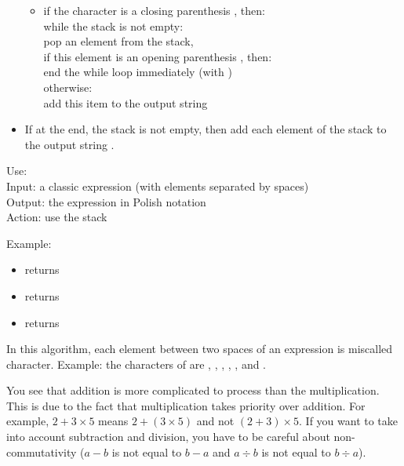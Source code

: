 \documentclass[11pt,class=report,crop=false]{standalone}
\begin{document}
\begin{activite}
\begin{algorithme}
\begin{itemize}
\begin{itemize}
     \item if the character is a closing parenthesis , then: \\
     while the stack is not empty: \\
     \indentation pop an element from the stack, \\
     \indentation if this element is an opening parenthesis , then: \\
     \indentation \indentation end the \og{}while\fg{} loop immediately  (with )\\  
     \indentation otherwise: \\       
     \indentation \indentation add this item to the output string \\

   \end{itemize}          
         
    \item If at the end, the stack is not empty, then add each element of the stack to the output string .
  \end{itemize} 
             
 \end{algorithme}
 
 
   \begin{fonction}
  Use:  \\
  Input: a classic expression (with elements separated by spaces) \\
  Output: the expression in Polish notation \\
  Action: use the stack
  
  \medskip
  
  Example:
  \begin{itemize}
     \item {} returns 
     \item {} returns 
     \item {} returns 
  \end{itemize}     
  \end{fonction}
  
 In this algorithm, each element between two spaces of an expression is miscalled \og{}character\fg{}. Example: the characters of  are \ci{(}, , \ci{+}, , \ci{)}, \ci{*} and .
 
 You see that addition is more complicated to process than the multiplication. This is due to the fact that multiplication takes priority over addition. For example, $2+3 \times 5$ means $2+(3 \times 5)$ and not $(2+3) \times 5$. 
 If you want to take into account subtraction and division, you have to be careful about non-commutativity ($a-b$ is not equal to $b-a$ and $a\div b$ is not equal to $b \div a$).
 


\end{activite}
\end{document}
